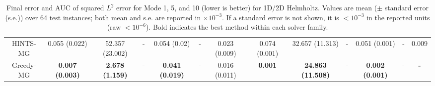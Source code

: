\documentclass{article} %
\begin{document}
\begin{table}[]
{\begin{tabular}{|c|c|c|c|c|c|c|c|c|c|c|c|c|}
        HINTS-MG & 0.055 (0.022) & 52.357 (23.002) & - & 0.054 (0.02) & - & 0.023 (0.009) & 0.074 (0.001) & 32.657 (11.313) & - & 0.051 (0.001) & - & 0.009  \\
        Greedy-MG & \textbf{0.007 (0.003)} & \textbf{2.678 (1.159)} & - & \textbf{0.041 (0.019)} & - & 0.016 (0.011) & \textbf{0.001}  & \textbf{24.863 (11.508)} & - & \textbf{0.002 (0.001)} & - & \textbf{-} \\
         \hline
    \end{tabular}
    }
    \caption{Final error and AUC of squared $L^2$ error for Mode 1, 5, and 10 (lower is better) for 1D/2D Helmholtz. Values are mean ($\pm$ standard error (s.e.)) over 64 test instances; both mean and s.e. are reported in $\times 10^{-3}$. If a standard error is not shown, it is $< 10^{-3}$ in the reported units (raw $< 10^{-6}$). Bold indicates the best method within each solver family.}
    \label{tab:modecomparisonHelmholtz}
\end{table}


\begin{table}[]
    \centering
    \caption{Final error and AUC of squared $L^2$ error of Mode 1, 5, and 10 for varying numbers of solvers. Values are mean ($\pm$ standard error (s.e.)) over 64 test instances; both mean and s.e. are reported in $\times 10^{-3}$.}
    \label{tab:modecomparison2}
\end{table}
\end{document}
